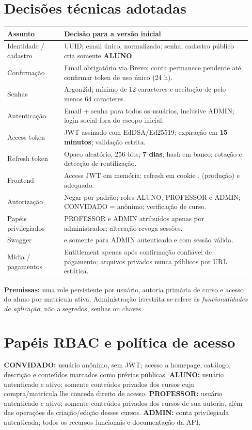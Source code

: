 \documentclass[10pt,a4paper,oneside]{extarticle}
\newcommand{\code}[1]{\texttt{\detokenize{#1}}}
\newcommand{\smalltable}{\fontsize{9}{11}\selectfont}
\begin{document}
\section{Decisões técnicas adotadas}
{\smalltable
\begin{tabularx}{\textwidth}{@{}L{3.6cm}Y@{}}\toprule
\textbf{Assunto} & \textbf{Decisão para a versão inicial}\\\midrule
Identidade / cadastro & UUID; email único, normalizado; senha; cadastro público cria somente \textbf{ALUNO}.\\
Confirmação & Email obrigatório via Brevo; conta permanece pendente até confirmar token de uso único (24 h).\\
Senhas & Argon2id; mínimo de 12 caracteres e aceitação de pelo menos 64 caracteres.\\
Autenticação & Email + senha para todos os usuários, inclusive ADMIN; login social fora do escopo inicial.\\
Access token & JWT assinado com EdDSA/Ed25519; expiração em \textbf{15 minutos}; validação estrita.\\
Refresh token & Opaco aleatório, 256 bits; \textbf{7 dias}; hash em banco; rotação e detecção de reutilização.\\
Frontend & Access JWT em memória; refresh em cookie \code{HttpOnly}, \code{Secure} (produção) e \code{SameSite} adequado.\\
Autorização & Negar por padrão; roles ALUNO, PROFESSOR e ADMIN; CONVIDADO = anônimo; verificação de curso.\\
Papéis privilegiados & PROFESSOR e ADMIN atribuídos apenas por administrador; alteração revoga sessões.\\
Swagger & \code{/docs} e \code{/openapi.json} somente para ADMIN autenticado e com sessão válida.\\
Mídia / pagamentos & Entitlement apenas após confirmação confiável de pagamento; arquivos privados nunca públicos por URL estática.\\
\bottomrule\end{tabularx}}

\textbf{Premissas:} uma role persistente por usuário, autoria primária de curso e acesso do aluno por matrícula ativa. Administração irrestrita se refere às \emph{funcionalidades da aplicação}, não a segredos, senhas ou chaves.
\clearpage

\section{Papéis RBAC e política de acesso}
\textbf{CONVIDADO:} usuário anônimo, sem JWT; acesso a homepage, catálogo, descrição e conteúdos marcados como prévias públicas. \textbf{ALUNO:} usuário autenticado e ativo; somente conteúdos privados dos cursos cuja compra/matrícula lhe conceda direito de acesso. \textbf{PROFESSOR:} usuário autenticado e ativo; somente conteúdos privados dos cursos de sua autoria, além das operações de criação/edição desses cursos. \textbf{ADMIN:} conta privilegiada autenticada; todos os recursos funcionais e documentação da API.
\end{document}
